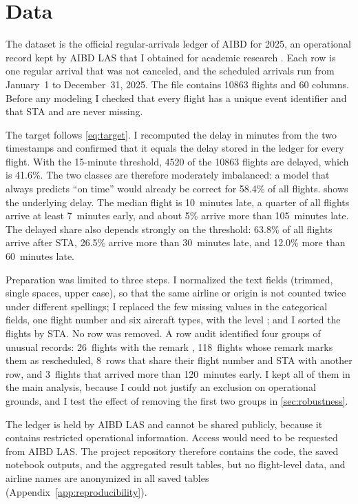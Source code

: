 \section{Data}\label{sec:data}

The dataset is the official regular-arrivals ledger of AIBD for 2025, an operational record kept by AIBD LAS that I obtained for academic research \citep{aibd2025ledger}. Each row is one regular arrival that was not canceled, and the scheduled arrivals run from January~1 to December~31, 2025. The file contains \num{10863} flights and 60 columns. Before any modeling I checked that every flight has a unique event identifier and that STA and \blockon{} are never missing.

The target follows \cref{eq:target}. I recomputed the delay in minutes from the two timestamps and confirmed that it equals the delay stored in the ledger for every flight. With the 15-minute threshold, \num{4520} of the \num{10863} flights are delayed, which is 41.6\%. The two classes are therefore moderately imbalanced: a model that always predicts ``on time'' would already be correct for 58.4\% of all flights.  shows the underlying delay. The median flight is 10~minutes late, a quarter of all flights arrive at least 7~minutes early, and about 5\% arrive more than 105~minutes late. The delayed share also depends strongly on the threshold: 63.8\% of all flights arrive after STA, 26.5\% arrive more than 30~minutes late, and 12.0\% more than 60~minutes late.



Preparation was limited to three steps. I normalized the text fields (trimmed, single spaces, upper case), so that the same airline or origin is not counted twice under different spellings; I replaced the few missing values in the categorical fields, one flight number and six aircraft types, with the level ; and I sorted the flights by STA. No row was removed. A row audit identified four groups of unusual records: 26~flights with the remark , 118~flights whose remark marks them as rescheduled, 8~rows that share their flight number and STA with another row, and 3~flights that arrived more than 120~minutes early. I kept all of them in the main analysis, because I could not justify an exclusion on operational grounds, and I test the effect of removing the first two groups in \cref{sec:robustness}.

The ledger is held by AIBD LAS and cannot be shared publicly, because it contains restricted operational information. Access would need to be requested from AIBD LAS. The project repository therefore contains the code, the saved notebook outputs, and the aggregated result tables, but no flight-level data, and airline names are anonymized in all saved tables (Appendix~\ref{app:reproducibility}).
